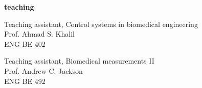 \documentclass[11pt, a4paper]{article}
\begin{document}
\vspace{0.8cm}
\textbf{\Large teaching}
\begin{description}[topsep=2pt, align=right, leftmargin=!, labelwidth=\widthof{\textbf{2016}}]
    \item [2016] Teaching assistant, Control systems in biomedical engineering \\ Prof. Ahmad S. Khalil \\ ENG BE 402
    \item [2015] Teaching assistant, Biomedical measurements II \\ Prof. Andrew C. Jackson \\ ENG BE 492
\end{description}
\end{document}
